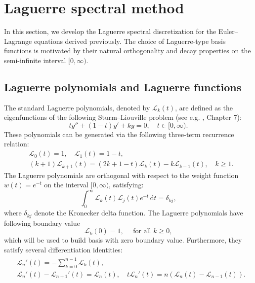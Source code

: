 \documentclass[a4paper,fleqn, 12pt]{cas-sc}
\newcommand{\diff}{\,\mathrm{d}}
\newcommand{\LaP}{{\mathscr{L}}}
\numberwithin{table}{section}
\begin{document}
\section{Laguerre spectral method}
\label{Laguerre Spectral Method}

In this section, we develop the Laguerre spectral discretization for the Euler--Lagrange equations derived previously. The choice of Laguerre-type basis functions is motivated by their natural orthogonality and decay properties on the semi-infinite interval $[0, \infty)$.

\subsection{Laguerre polynomials and Laguerre functions}
\label{Laguerre Polynomials and Laguerre Functions}
The standard Laguerre polynomials, denoted by $\mathscr{L}_k(t)$, are defined as the eigenfunctions of the following Sturm--Liouville problem (see e.g.
{\cite{shen_spectral_2011}}, Chapter 7):
\[
    t y'' + (1 - t) y' + ky = 0, \quad t \in [0, \infty).
\]
These polynomials can be generated via the following three-term recurrence relation:
\begin{equation}\label{eq:std-3term}
\begin{aligned}
    &\LaP_0(t) = 1, \quad
    \LaP_1(t) = 1 - t, \\
    &(k + 1) \LaP_{k+1}(t)  = (2k + 1 - t) \LaP_k(t) - k \LaP_{k-1}(t), \quad k \ge 1.    
\end{aligned}
\end{equation}
The Laguerre polynomials are orthogonal with respect to the weight function $w(t) = e^{-t}$ on the interval $[0, \infty)$, satisfying:
\[
    \int_0^{\infty} \LaP_k(t) \LaP_j(t) e^{-t} \diff t = \delta_{kj},
\]
where $\delta_{kj}$ denote the Kronecker delta function. The Laguerre polynomials have following boundary value
\begin{equation}\label{eq:LaP-bv}
    \LaP_k(0) = 1, \quad \text{ for all } k \ge 0,
\end{equation} 
which will be used to build basis with zero boundary value. 
Furthermore, they satisfy several differentiation identities:
\begin{align}\label{eq:LaP-derivatives}
    \begin{aligned}
    & \LaP_n'(t) = -\sum_{k=0}^{n-1} \LaP_k(t), \\
    & \LaP_n'(t) - \LaP_{n+1}'(t) = \LaP_n(t), \quad
    t {\LaP}_n'(t) = n(\LaP_n(t) - \LaP_{n-1}(t)).
    \end{aligned}
\end{align}
\end{document}

